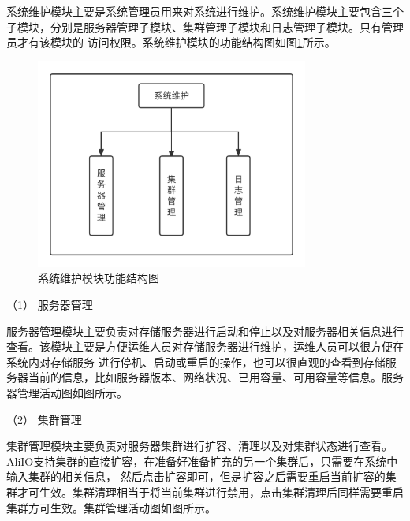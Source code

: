 系统维护模块主要是系统管理员用来对系统进行维护。系统维护模块主要包含三个子模块，分别是服务器管理子模块、集群管理子模块和日志管理子模块。只有管理员才有该模块的
访问权限。系统维护模块的功能结构图如图\ref{fig:系统维护模块功能结构图}所示。

\begin{figure}[htb]
    \centering
    \includegraphics[width=0.8\textwidth]{my_figures/chapter4/系统维护模块功能结构图.png}
    \caption{系统维护模块功能结构图}
    \label{fig:系统维护模块功能结构图}
\end{figure}

（1） 服务器管理

服务器管理模块主要负责对存储服务器进行启动和停止以及对服务器相关信息进行查看。该模块主要是方便运维人员对存储服务器进行维护，运维人员可以很方便在系统内对存储服务
进行停机、启动或重启的操作，也可以很直观的查看到存储服务器当前的信息，比如服务器版本、网络状况、已用容量、可用容量等信息。服务器管理活动图如图所示。


（2） 集群管理

集群管理模块主要负责对服务器集群进行扩容、清理以及对集群状态进行查看。AliIO支持集群的直接扩容，在准备好准备扩充的另一个集群后，只需要在系统中输入集群的相关信息，
然后点击扩容即可，但是扩容之后需要重启当前扩容的集群才可生效。集群清理相当于将当前集群进行禁用，点击集群清理后同样需要重启集群方可生效。集群管理活动图如图所示。

